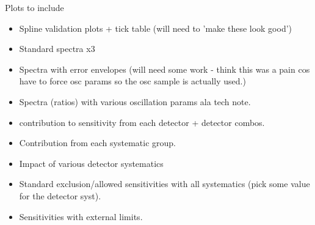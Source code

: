Plots to include
\begin{itemize}
    \item Spline validation plots + tick table (will need to 'make these look good')
    \item Standard spectra x3
    \item Spectra with error envelopes (will need some work - think this was a pain cos have to force osc params so the osc sample is actually used.)
    \item Spectra (ratios) with various oscillation params ala tech note.
    \item contribution to sensitivity from each detector + detector combos.
    \item Contribution from each systematic group.
    \item Impact of various detector systematics 
    \item Standard exclusion/allowed sensitivities with all systematics (pick some value for the detector syst).
    \item Sensitivities with external limits.
\end{itemize}
